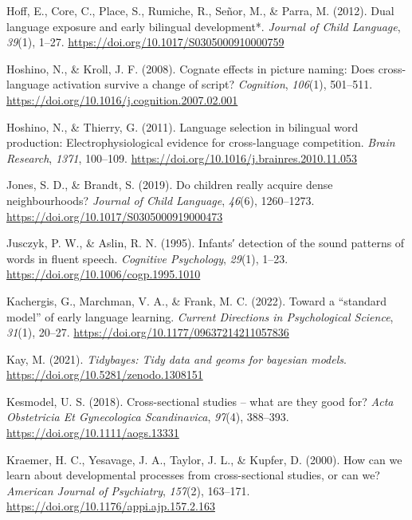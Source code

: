 \documentclass[
  man,
  floatsintext,
  colorlinks=true,linkcolor=blue,citecolor=blue,urlcolor=blue,biblatex]{apa7}
\newlength{\cslhangindent}
\newlength{\cslentryspacingunit} %
\newenvironment{CSLReferences}[2] %
 {%
  \setlength{\parindent}{0pt}
  \ifodd #1
  \let\oldpar\par
  \def\par{\hangindent=\cslhangindent\oldpar}
  \fi
  \setlength{\parskip}{#2\cslentryspacingunit}
 }%
 {}
\begin{document}
\begin{CSLReferences}{1}{0}
\leavevmode{}%
Hoff, E., Core, C., Place, S., Rumiche, R., Señor, M., \& Parra, M.
(2012). Dual language exposure and early bilingual development*.
\emph{Journal of Child Language}, \emph{39}(1), 1--27.
\url{https://doi.org/10.1017/S0305000910000759}

\leavevmode{}%
Hoshino, N., \& Kroll, J. F. (2008). Cognate effects in picture naming:
Does cross-language activation survive a change of script?
\emph{Cognition}, \emph{106}(1), 501--511.
\url{https://doi.org/10.1016/j.cognition.2007.02.001}

\leavevmode{}%
Hoshino, N., \& Thierry, G. (2011). Language selection in bilingual word
production: Electrophysiological evidence for cross-language
competition. \emph{Brain Research}, \emph{1371}, 100--109.
\url{https://doi.org/10.1016/j.brainres.2010.11.053}

\leavevmode{}%
Jones, S. D., \& Brandt, S. (2019). Do children really acquire dense
neighbourhoods? \emph{Journal of Child Language}, \emph{46}(6),
1260--1273. \url{https://doi.org/10.1017/S0305000919000473}

\leavevmode{}%
Jusczyk, P. W., \& Aslin, R. N. (1995). Infants′ detection of the sound
patterns of words in fluent speech. \emph{Cognitive Psychology},
\emph{29}(1), 1--23. \url{https://doi.org/10.1006/cogp.1995.1010}

\leavevmode{}%
Kachergis, G., Marchman, V. A., \& Frank, M. C. (2022). Toward a
{``standard model''} of early language learning. \emph{Current
Directions in Psychological Science}, \emph{31}(1), 20--27.
\url{https://doi.org/10.1177/09637214211057836}

\leavevmode{}%
Kay, M. (2021). \emph{Tidybayes: Tidy data and geoms for bayesian
models}. \url{https://doi.org/10.5281/zenodo.1308151}

\leavevmode{}%
Kesmodel, U. S. (2018). Cross-sectional studies -- what are they good
for? \emph{Acta Obstetricia Et Gynecologica Scandinavica}, \emph{97}(4),
388--393. \url{https://doi.org/10.1111/aogs.13331}

\leavevmode{}%
Kraemer, H. C., Yesavage, J. A., Taylor, J. L., \& Kupfer, D. (2000).
How can we learn about developmental processes from cross-sectional
studies, or can we? \emph{American Journal of Psychiatry},
\emph{157}(2), 163--171.
\url{https://doi.org/10.1176/appi.ajp.157.2.163}


\end{CSLReferences}
\end{document}
